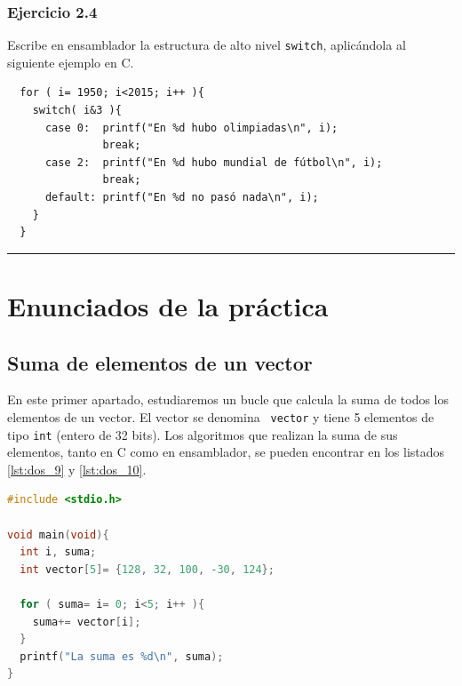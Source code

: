 \subsubsection{Ejercicio 2.4}

Escribe en ensamblador la estructura de alto nivel {\tt switch},
aplicándola al siguiente ejemplo en C.

\begin{center}
\begin{myfbox}
\small
\begin{minipage}{0.92\linewidth}
\begin{minipage}{0.6\linewidth}
\begin{verbatim}
  for ( i= 1950; i<2015; i++ ){
    switch( i&3 ){
      case 0:  printf("En %d hubo olimpiadas\n", i);
               break;
      case 2:  printf("En %d hubo mundial de fútbol\n", i);
               break;
      default: printf("En %d no pasó nada\n", i);
    }
  }
\end{verbatim}
\end{minipage}
\begin{center}
\colorbox[gray]{1}{\rule{0cm}{7cm}\rule{11cm}{0cm}}
\end{center}
\end{minipage}
\end{myfbox}
\end{center}

\section{Enunciados de la práctica}


\subsection{Suma de elementos de un vector}

En este primer apartado, estudiaremos un bucle que calcula la suma de
todos los elementos de un vector. El vector se denomina {\tt
vector} y tiene 5 elementos de tipo {\tt int} (entero de 32 bits). Los algoritmos
que realizan la suma de sus elementos, tanto en C como en ensamblador, se
pueden encontrar en los listados \ref{lst:dos_9} y \ref{lst:dos_10}.

\begin{lstlisting}[caption={Suma de elementos de un vector (tipos4.c)},label={lst:dos_9},language=C]
#include <stdio.h>

void main(void){
  int i, suma;
  int vector[5]= {128, 32, 100, -30, 124};

  for ( suma= i= 0; i<5; i++ ){
    suma+= vector[i];
  }
  printf("La suma es %d\n", suma);
}
\end{lstlisting}

